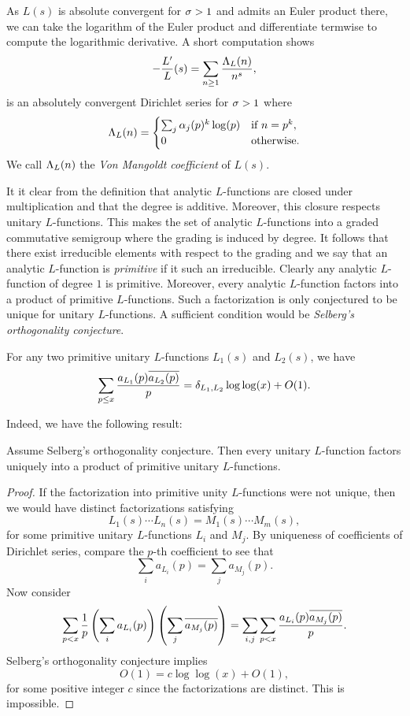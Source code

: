 \documentclass[12pt]{article}
\begin{document}
    As \(L(s)\) is absolute convergent for \(\sigma > 1\) and admits an Euler product there, we can take the logarithm of the Euler product and differentiate termwise to compute the logarithmic derivative. A short computation shows
    \[
       -\frac{L'}{L}(s) = \sum_{n \ge 1}\frac{\Lambda_{L}(n)}{n^{s}},
    \]
    is an absolutely convergent Dirichlet series for \(\sigma > 1\) where
    \[
      \Lambda_{L}(n) = \begin{cases} \sum_{j}\alpha_{j}(p)^{k}\log(p) & \text{if \(n = p^{k}\)}, \\ 0 & \text{otherwise}. \end{cases}
    \]
    We call \(\Lambda_{L}(n)\) the \textit{Von Mangoldt coefficient} of \(L(s)\).

    It it clear from the definition that analytic \(L\)-functions are closed under multiplication and that the degree is additive. Moreover, this closure respects unitary \(L\)-functions. This makes the set of analytic \(L\)-functions into a graded commutative semigroup where the grading is induced by degree. It follows that there exist irreducible elements with respect to the grading and we say that an analytic \(L\)-function is \textit{primitive} if it such an irreducible. Clearly any analytic \(L\)-function of degree \(1\) is primitive. Moreover, every analytic \(L\)-function factors into a product of primitive \(L\)-functions. Such a factorization is only conjectured to be unique for unitary \(L\)-functions. A sufficient condition would be \textit{Selberg's orthogonality conjecture}.

    \begin{conjecture*}
      For any two primitive unitary \(L\)-functions \(L_{1}(s)\) and \(L_{2}(s)\), we have
      \[
        \sum_{p \le x}\frac{a_{L_{1}}(p)\overline{a_{L_{2}}(p)}}{p} = \delta_{L_{1},L_{2}}\log\log(x)+O(1).
      \]
    \end{conjecture*}

    Indeed, we have the following result:

    \begin{proposition}
      Assume Selberg's orthogonality conjecture. Then every unitary \(L\)-function factors uniquely into a product of primitive unitary \(L\)-functions.
    \end{proposition}
    \begin{proof}
      If the factorization into primitive unity \(L\)-functions were not unique, then we would have distinct factorizations satisfying
      \[
        L_{1}(s) \cdots L_{n}(s) = M_{1}(s) \cdots M_{m}(s),
      \]
      for some primitive unitary \(L\)-functions \(L_{i}\) and \(M_{j}\). By uniqueness of coefficients of Dirichlet series, compare the \(p\)-th coefficient to see that
      \[
        \sum_{i}a_{L_{i}}(p) = \sum_{j}a_{M_{j}}(p).
      \]
      Now consider
      \[
        \sum_{p < x}\frac{1}{p}\left(\sum_{i}a_{L_{i}}(p)\right)\left(\sum_{j}\overline{a_{M_{j}}(p)}\right) = \sum_{i,j}\sum_{p < x}\frac{a_{L_{i}}(p)\overline{a_{M_{j}}(p)}}{p}.
      \]
      Selberg's orthogonality conjecture implies
      \[
        O(1) = c\log\log(x)+O(1),
      \]
      for some positive integer \(c\) since the factorizations are distinct. This is impossible.
    \end{proof}
\end{document}
